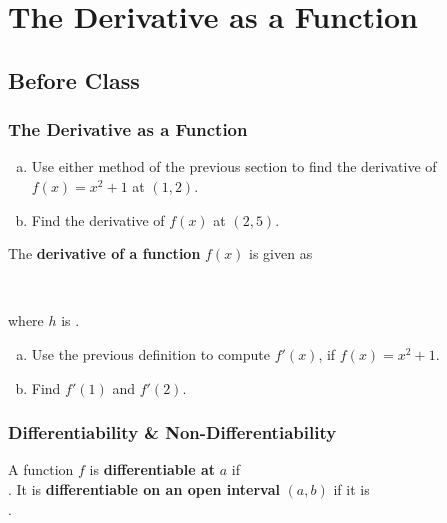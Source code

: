 \documentclass[notes]{subfiles}
\begin{document}
	\fancyhead[LO,RE]{\bfseries \small \currentname}
	\fancyfoot[C]{{}}
	\fancyfoot[LO,RE]{\large \thepage}	%
	
\section*{The Derivative as a Function}\label{cs32}
	\subsection*{Before Class}
	\subsubsection*{The Derivative as a Function}
	\begin{ex}
			\begin{enumerate}[(a)]
				\item Use either method of the previous section to find the derivative of \(f(x) = x^2 + 1\) at \((1,2)\).
					
				\item Find the derivative of \(f(x)\) at \((2,5)\).
			\end{enumerate}
		\end{ex}
			
			
		\begin{defn}
			The \textbf{derivative of a function} \(f(x)\) is given as 
			
				\\ \vspace{.75in}
			
			where \(h\) is \blank{4}.
			
		\end{defn}
			\newpage
			
		\begin{ex}
			\begin{enumerate}[(a)]
				\item Use the previous definition to compute \(f'(x)\), if \(f(x) = x^2 + 1\).  
					\vs{1}
				\item Find \(f'(1)\) and \(f'(2)\).
					\vs{.5}
			\end{enumerate}
		\end{ex}
		
	\subsubsection*{Differentiability \& Non-Differentiability}
		\begin{defn}[Differentiability]
			A function \(f\) is \textbf{differentiable at } \(a\) if \\[10pt] . It is \textbf{differentiable on an open interval} \((a,b)\) if it is\\[15pt] \blank{6.2}.
			
		\end{defn}
		
\end{document}
